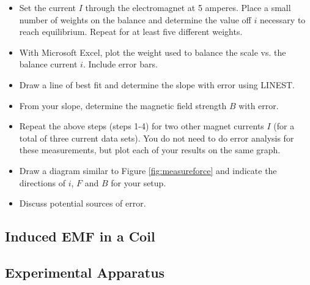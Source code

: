 \begin{itemize}
  \item Set the current $I$ through the electromagnet at 5 amperes. Place a small number of weights on the balance and determine the value off $i$ necessary to reach equilibrium. Repeat for at least five different weights.

  \item With Microsoft Excel, plot the weight used to balance the scale vs. the balance current $i$. Include error bars.

  \item Draw a line of best fit and determine the slope with error using LINEST.

  \item From your slope, determine the magnetic field strength $B$ with error.

  \item Repeat the above steps (steps 1-4)  for two other magnet currents $I$ (for a total of three current data sets). You do not need to do error analysis for these measurements, but plot each of your results on the same graph.

  \item Draw a diagram similar to Figure \ref{fig:measureforce} and indicate the directions of $i$, $F$ and $B$ for your setup.

  \item Discuss potential sources of error.
\end{itemize}

\subsection{Induced EMF in a Coil}

\subsection{Experimental Apparatus}

